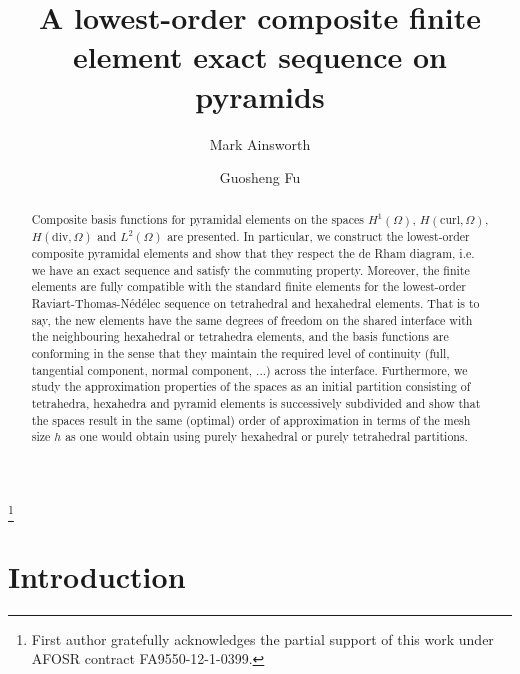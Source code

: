 \documentclass[twoside,reqno,final]{amsart}
\newcommand{\NED}{N\'ed\'elec }
\begin{document}
\title[Pyramidal sequence]{A lowest-order composite finite element exact sequence on pyramids}
\author{Mark Ainsworth}
\address{Division of Applied Mathematics, Brown University, 182 George St,
Providence RI 02912, USA.}
\thanks{First author gratefully acknowledges the partial support of this work
under AFOSR contract FA9550-12-1-0399.}

\author{Guosheng Fu}
\address{Division of Applied Mathematics, Brown University, 182 George St,
Providence RI 02912, USA.}

\keywords{}


\begin{abstract} 

Composite basis functions for pyramidal elements on the spaces $H^1(\Omega)$,
$H(\mathrm{curl},\Omega)$, $H(\mathrm{div},\Omega)$ and $L^2(\Omega)$ are
presented. In particular, we construct the lowest-order composite pyramidal
elements and show that they respect the de Rham diagram, i.e. we have an exact
sequence and satisfy the commuting property. Moreover, the finite elements are
fully compatible with the standard finite elements for the lowest-order
Raviart-Thomas-\NED sequence on tetrahedral and hexahedral elements. That is to
say, the new elements have the same degrees of freedom on the shared interface
with the neighbouring hexahedral or tetrahedra elements, and the basis
functions are conforming in the sense that they maintain the required level of
continuity (full, tangential component, normal component, ...) across the
interface. Furthermore, we study the approximation properties of the spaces as
an initial partition consisting of tetrahedra, hexahedra and pyramid elements
is successively subdivided and show that the spaces result in the same
(optimal) order of approximation in terms of the mesh size $h$ as one would
obtain using purely hexahedral or purely tetrahedral partitions. 
\end{abstract} \maketitle

\section{Introduction}
\end{document}
